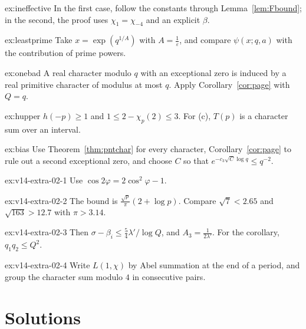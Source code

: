 \begin{hint}{ex:ineffective}
In the first case, follow the constants through Lemma~\ref{lem:Fbound}; in the second, the proof uses $\chi_1=\chi_{-4}$ and an explicit $\beta$.
\end{hint}

\begin{hint}{ex:leastprime}
Take $x=\exp(q^{1/A})$ with $A=\frac1\varepsilon$, and compare $\psi(x;q,a)$ with the contribution of prime powers.
\end{hint}

\begin{hint}{ex:onebad}
A real character modulo $q$ with an exceptional zero is induced by a real primitive character of modulus at most $q$. Apply Corollary~\ref{cor:page} with $Q=q$.
\end{hint}

\begin{hint}{ex:hupper}
$h(-p)\ge1$ and $1\le2-\chi_p(2)\le3$. For (c), $T(p)$ is a character sum over an interval.
\end{hint}

\begin{hint}{ex:bias}
Use Theorem~\ref{thm:pntchar} for every character, Corollary~\ref{cor:page} to rule out a second exceptional zero, and choose $C$ so that $e^{-c_3\sqrt C\log q}\le q^{-2}$.
\end{hint}

\begin{hint}{ex:v14-extra-02-1}
Use $\cos 2\varphi=2\cos^2\varphi-1$.
\end{hint}

\begin{hint}{ex:v14-extra-02-2}
The bound is $\frac{\sqrt p}\pi(2+\log p)$. Compare $\sqrt7<2.65$ and $\sqrt{163}>12.7$ with $\pi>3.14$.
\end{hint}

\begin{hint}{ex:v14-extra-02-3}
Then $\sigma-\beta_i\le\frac54\lambda'/\log Q$, and $A_3=\frac1{2\lambda'}$. For the corollary, $q_1q_2\le Q^2$.
\end{hint}

\begin{hint}{ex:v14-extra-02-4}
Write $L(1,\chi)$ by Abel summation at the end of a period, and group the character sum modulo $4$ in consecutive pairs.
\end{hint}

\section{Solutions}

